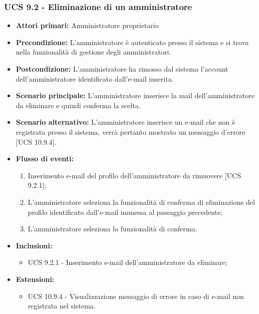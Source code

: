 \subsubsection{UCS 9.2 - Eliminazione di un amministratore}%

\begin{itemize}
\item \textbf{Attori primari:} Amministratore proprietario
\item \textbf{Precondizione:} L'amministratore è autenticato presso il sistema e si trova nella funzionalità di gestione degli amministratori.
\item \textbf{Postcondizione:} L'amministratore ha rimosso dal sistema l'account dell'amministratore identificato dall'e-mail inserita.
\item \textbf{Scenario principale:} L'amministratore inserisce la mail dell'amministratore da eliminare e quindi conferma la scelta.
\item \textbf{Scenario alternativo:} L'amministratore inserisce un e-mail che non è registrata presso il sistema, verrà pertanto mostrato un messaggio d'errore [UCS 10.9.4].
\item \textbf{Flusso di eventi:} %
  \begin{enumerate}
        \item Inserimento e-mail del profilo dell'amministratore da rimuovere [UCS 9.2.1];
        \item L'amministratore seleziona la funzionalità di conferma di eliminazione del profilo identificato dall'e-mail immessa al passaggio precedente;
        \item L'amministratore seleziona la funzionalità di conferma.
    \end{enumerate}
    \item \textbf{Inclusioni:}
	\begin{itemize}
		\item UCS 9.2.1 - Inserimento e-mail dell'amministratore da eliminare;
	\end{itemize}
\item \textbf{Estensioni:}
	\begin{itemize}
		\item UCS 10.9.4 - Visualizzazione messaggio di errore in caso di e-mail non registrata nel sistema.
	\end{itemize}
\end{itemize}

